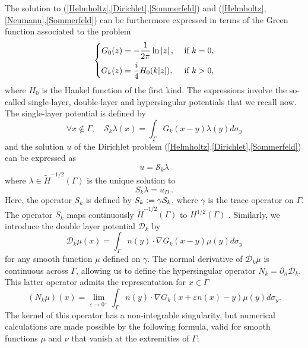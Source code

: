 \documentclass[a4paper]{subfiles}
\begin{document}
The solution to (\ref{Helmholtz},\ref{Dirichlet},\ref{Sommerfeld}) and (\ref{Helmholtz},\ref{Neumann},\ref{Sommerfeld}) can be furthermore expressed in 
terms of the Green function associated to the problem
\begin{equation}
	\left\{
	\begin{aligned}
		G_0(z) &= -\dfrac{1}{2\pi} \ln \left\lvert z \right\rvert, && \text{ if } k= 0,\\
		G_k(z) &= \frac{i}{4}H_0(k|z|), && \text{ if } k > 0,
	\end{aligned} 
	\right.
\end{equation} 
where $H_0$ is the Hankel function of the first kind. The expressions involve the so-called single-layer, double-layer and hypersingular potentials that we 
recall now. The single-layer potential is defined by
\begin{equation}
	\forall x \notin \Gamma,  \quad \mathcal{S}_k\lambda(x) = \int_{\Gamma}G_k(x-y)\lambda(y)d\sigma_y
	\label{defSk}
\end{equation}
and the solution $u$ of the Dirichlet problem (\ref{Helmholtz},\ref{Dirichlet},\ref{Sommerfeld}) can be expressed 
as
\begin{equation}
	u = \mathcal{S}_k \lambda
\end{equation}
where $\lambda \in \tilde{H}^{-1/2}(\Gamma)$ is the unique solution to 
\begin{equation}
	S_k \lambda = u_D\,.
	\label{Sklambda}
\end{equation}
Here, the operator $S_k$ is defined by $S_k \mathrel{\mathop:}= \gamma \mathcal{S}_k$, where $\gamma$ is the trace operator on $\Gamma$. The operator $S_k$ maps continuously 
$\tilde{H}^{-1/2}(\Gamma)$ to $H^{1/2}(\Gamma)$ \cite[Theorem 1.8]{wendland1990hypersingular}. 
Similarly, we introduce the double layer potential $\mathcal{D}_k$ by 
\[\mathcal{D}_k \mu(x) = \int_{\Gamma} n(y) \cdot \nabla G_k(x-y) \mu(y) d\sigma_y\]
for any smooth function $\mu$ defined on $\gamma$.
The normal derivative of $\mathcal{D}_k\mu$ is continuous across $\Gamma$, allowing us to define the hypersingular operator $N_k = \partial_n \mathcal{D}_k$. 
This latter operator admits the representation for $x\in \Gamma$
\begin{equation}
	(N_k \mu) (x) = \lim_{\varepsilon \to 0^+} \int_{\Gamma} n(y) \cdot \nabla G_k(x + \varepsilon n(x) - y) \mu(y) d\sigma_y.
	\label{defNk}
\end{equation}
The kernel of this operator has a non-integrable singularity, but numerical calculations are made possible by the following formula, valid for smooth functions 
$\mu$ and $\nu$ that vanish at the extremities of $\Gamma$: 
\end{document}
